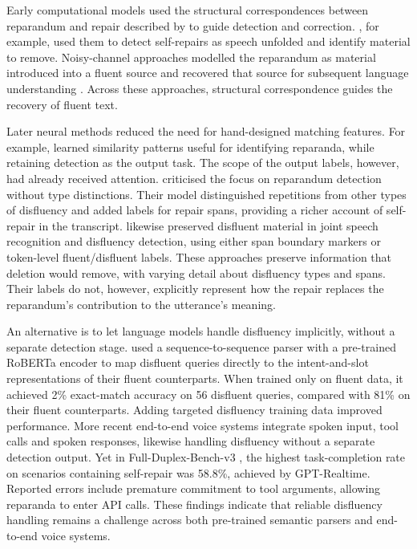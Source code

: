 \documentclass{article}
\begin{document}
Early computational models used the structural correspondences between
reparandum and repair described by \citet{leveltMonitoringSelfrepairSpeech1983}
to guide detection and correction. \citet{heemanDetectingCorrectingSpeech1994},
for example, used them to detect self-repairs as speech unfolded and identify
material to remove. Noisy-channel approaches modelled the reparandum as
material introduced into a fluent source and recovered that source for
subsequent language understanding
\citep{johnsonTAGbasedNoisychannelModel2004,honalCorrectionDisfluenciesSpontaneous2003}.
Across these approaches, structural correspondence guides the recovery of
fluent text.

Later neural methods reduced the need for hand-designed matching features.
For example, \citet{zayatsRobustCrossdomainDisfluency2018} learned similarity
patterns useful for identifying reparanda, while retaining detection as the
output task. The scope of the output labels, however, had already received
attention. \citet{zayatsMultidomainDisfluencyRepair2014} criticised the focus
on reparandum detection without type distinctions. Their model distinguished
repetitions from other types of disfluency and added labels for repair spans,
providing a richer account of self-repair in the transcript.
\citet{futamiStreamingJointSpeech2023} likewise preserved disfluent material
in joint speech recognition and disfluency detection, using either span
boundary markers or token-level fluent/disfluent labels. These approaches
preserve information that deletion would remove, with varying detail about
disfluency types and spans. Their labels do not, however, explicitly
represent how the repair replaces the reparandum's contribution to the
utterance's meaning.

An alternative is to let language models handle disfluency implicitly,
without a separate detection stage.
\citet{senSemanticParsingDisfluent2021} used a sequence-to-sequence parser
with a pre-trained RoBERTa encoder to map disfluent queries directly to
the intent-and-slot representations of their fluent counterparts. When
trained only on fluent data, it achieved 2\% exact-match accuracy on 56
disfluent queries, compared with 81\% on their fluent counterparts.
Adding targeted disfluency training data improved performance. More recent
end-to-end voice systems integrate spoken input, tool calls and spoken
responses, likewise handling disfluency without a separate detection
output. Yet in Full-Duplex-Bench-v3 \citep{linFullDuplexBenchv3BenchmarkingTool2026}, the highest task-completion rate on
scenarios containing self-repair was 58.8\%, achieved by GPT-Realtime. Reported errors include
premature commitment to tool arguments, allowing reparanda to enter
API calls. These findings indicate that reliable disfluency handling
remains a challenge across both pre-trained semantic parsers and
end-to-end voice systems.
\end{document}
